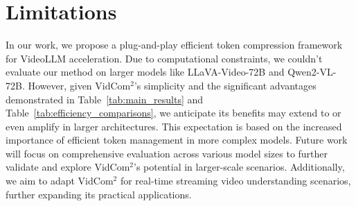\section{Limitations}
\label{sec:Limitations}

In our work, we propose a plug-and-play efficient token compression framework for VideoLLM acceleration. Due to computational constraints, we couldn't evaluate our method on larger models like LLaVA-Video-72B and Qwen2-VL-72B. However, given VidCom$^2$'s simplicity and the significant advantages demonstrated in Table~\ref{tab:main_results} and Table~\ref{tab:efficiency_comparisons}, we anticipate its benefits may extend to or even amplify in larger architectures. This expectation is based on the increased importance of efficient token management in more complex models. Future work will focus on comprehensive evaluation across various model sizes to further validate and explore VidCom$^2$'s potential in larger-scale scenarios. Additionally, we aim to adapt VidCom$^2$ for real-time streaming video understanding scenarios, further expanding its practical applications.

